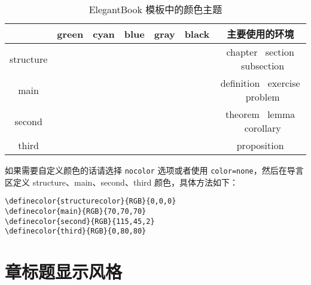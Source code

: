\documentclass[cn,11pt,fancy,hide,pad]{elegantbook}
\begin{document}
\begin{table}[htbp]
\caption{ElegantBook 模板中的颜色主题\label{tab:color thm}}
\centering
\begin{tabular}{ccccccc}
\toprule
	        & \textcolor{structure1}{green} 
	        & \textcolor{structure2}{cyan} 
	        & \textcolor{structure3}{blue}
	        & \textcolor{structure4}{gray} 
	        & \textcolor{structure5}{black} 
	        & 主要使用的环境\\
\midrule
structure & \makecell{{\color{structure1}\rule{1cm}{1cm}}}
				& \makecell{{\color{structure2}\rule{1cm}{1cm}}}
				& \makecell{{\color{structure3}\rule{1cm}{1cm}}} 
				& \makecell{{\color{structure4}\rule{1cm}{1cm}}} 
				& \makecell{{\color{structure5}\rule{1cm}{1cm}}} 
				& chapter \ section \ subsection \\

main      & \makecell{{\color{main1}\rule{1cm}{1cm}}}
				& \makecell{{\color{main2}\rule{1cm}{1cm}}}
				& \makecell{{\color{main3}\rule{1cm}{1cm}}}
				& \makecell{{\color{main4}\rule{1cm}{1cm}}}
				& \makecell{{\color{main5}\rule{1cm}{1cm}}}
				& definition \ exercise \ problem \\

second    & \makecell{{\color{second1}\rule{1cm}{1cm}}}
				& \makecell{{\color{second2}\rule{1cm}{1cm}}}
				& \makecell{{\color{second3}\rule{1cm}{1cm}}}
				& \makecell{{\color{second4}\rule{1cm}{1cm}}}
				& \makecell{{\color{second5}\rule{1cm}{1cm}}}
				& theorem \ lemma \ corollary\\

third     & \makecell{{\color{third1}\rule{1cm}{1cm}}}
				& \makecell{{\color{third2}\rule{1cm}{1cm}}}
				& \makecell{{\color{third3}\rule{1cm}{1cm}}}
				& \makecell{{\color{third4}\rule{1cm}{1cm}}}
				& \makecell{{\color{third5}\rule{1cm}{1cm}}}
				& proposition\\
\bottomrule
\end{tabular}
\end{table}

如果需要自定义颜色的话请选择 \lstinline{nocolor} 选项或者使用 \lstinline{color=none}，然后在导言区定义 structure、main、second、third 颜色，具体方法如下：
\begin{lstlisting}
\definecolor{structurecolor}{RGB}{0,0,0}
\definecolor{main}{RGB}{70,70,70}    
\definecolor{second}{RGB}{115,45,2}    
\definecolor{third}{RGB}{0,80,80}   
\end{lstlisting}


\section{章标题显示风格}
\end{document}
